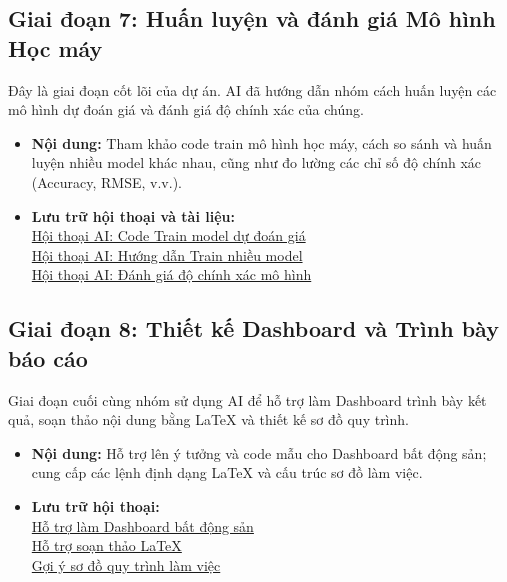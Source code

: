 \documentclass[12pt, a4paper]{article}
\begin{document}
\subsection{Giai đoạn 7: Huấn luyện và đánh giá Mô hình Học máy}
Đây là giai đoạn cốt lõi của dự án. AI đã hướng dẫn nhóm cách huấn luyện các mô hình dự đoán giá và đánh giá độ chính xác của chúng.
\begin{itemize}[label=$\bullet$]
    \item \textbf{Nội dung:} Tham khảo code train mô hình học máy, cách so sánh và huấn luyện nhiều model khác nhau, cũng như đo lường các chỉ số độ chính xác (Accuracy, RMSE, v.v.).
    \item \textbf{Lưu trữ hội thoại và tài liệu:} \\
    \href{https://aistudio.google.com/app/prompts?state=%7B%22ids%22:%5B%221EU9OC8FXo6WlJ2Q7zNFAFSw6J7gV8lcI%22%5D,%22action%22:%22open%22,%22userId%22:%22103260168952391043836%22,%22resourceKeys%22:%7B%7D%7D&usp=sharing}{Hội thoại AI: Code Train model dự đoán giá} \\
    \href{https://aistudio.google.com/app/prompts?state=%7B%22ids%22:%5B%221jQ4W3KeXbb4J_eX5l23p5WDTx59CjYTq%22%5D,%22action%22:%22open%22,%22userId%22:%22103260168952391043836%22,%22resourceKeys%22:%7B%7D%7D&usp=sharing}{Hội thoại AI: Hướng dẫn Train nhiều model} \\
    \href{https://aistudio.google.com/app/prompts?state=%7B%22ids%22:%5B%221Vb4ug7pl2tzyH8qEE4wces9Lr8jnWTx3%22%5D,%22action%22:%22open%22,%22userId%22:%22108088689730778455563%22,%22resourceKeys%22:%7B%7D%7D&usp=sharing}{Hội thoại AI: Đánh giá độ chính xác mô hình} \\

\end{itemize}

\subsection{Giai đoạn 8: Thiết kế Dashboard và Trình bày báo cáo}
Giai đoạn cuối cùng nhóm sử dụng AI để hỗ trợ làm Dashboard trình bày kết quả, soạn thảo nội dung bằng LaTeX và thiết kế sơ đồ quy trình.
\begin{itemize}[label=$\bullet$]
    \item \textbf{Nội dung:} Hỗ trợ lên ý tưởng và code mẫu cho Dashboard bất động sản; cung cấp các lệnh định dạng LaTeX và cấu trúc sơ đồ làm việc.
    \item \textbf{Lưu trữ hội thoại:} \\
    \href{https://aistudio.google.com/app/prompts?state=%7B%22ids%22:%5B%221E1FOlnE3tY2Hng9RZMgCPi1-qqMO3aWP%22%5D,%22action%22:%22open%22,%22userId%22:%22103260168952391043836%22,%22resourceKeys%22:%7B%7D%7D&usp=sharing}{Hỗ trợ làm Dashboard bất động sản} \\
    \href{https://aistudio.google.com/app/prompts?state=%7B%22ids%22:%5B%221VD6uj9sjw3nl71zDewpKb12Vfk984vn7%22%5D,%22action%22:%22open%22,%22userId%22:%22108088689730778455563%22,%22resourceKeys%22:%7B%7D%7D&usp=sharing}{Hỗ trợ soạn thảo LaTeX} \\
    \href{https://chatgpt.com/share/697ffeb9-d8e8-8008-b4d2-430302dd26e0}{Gợi ý sơ đồ quy trình làm việc}
\end{itemize}
\end{document}
